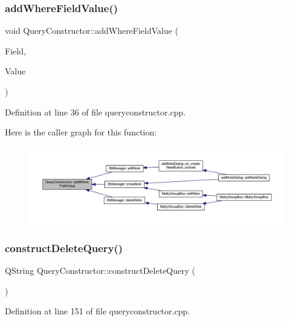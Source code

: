\subsubsection{\texorpdfstring{add\+Where\+Field\+Value()}{addWhereFieldValue()}}
{\footnotesize\ttfamily void Query\+Constructor\+::add\+Where\+Field\+Value (\begin{DoxyParamCaption}\item[{const Q\+String \&}]{Field,  }\item[{const Q\+String \&}]{Value }\end{DoxyParamCaption})}



Definition at line 36 of file queryconstructor.\+cpp.

Here is the caller graph for this function\+:
\nopagebreak
\begin{figure}[H]
\begin{center}
\leavevmode
\includegraphics[width=350pt]{classQueryConstructor_ad72f9e11656f92958cd6751eaaa70e0e_icgraph}
\end{center}
\end{figure}
\hypertarget{classQueryConstructor_a1585447293c477d7c5bebf4049cbbc07}{}\label{classQueryConstructor_a1585447293c477d7c5bebf4049cbbc07} 
\subsubsection{\texorpdfstring{construct\+Delete\+Query()}{constructDeleteQuery()}}
{\footnotesize\ttfamily Q\+String Query\+Constructor\+::construct\+Delete\+Query (\begin{DoxyParamCaption}{ }\end{DoxyParamCaption})}



Definition at line 151 of file queryconstructor.\+cpp.

